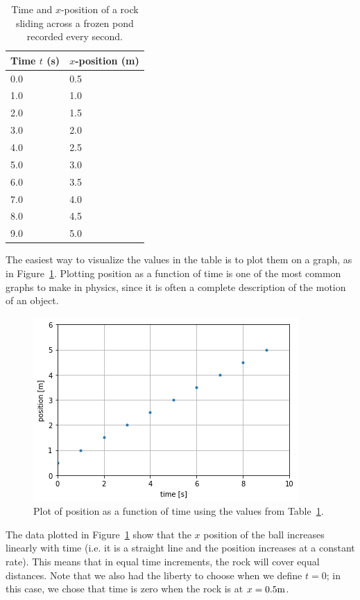 \begin{table}
\centering
\caption[]{Time and $x$-position of a rock sliding across a frozen pond recorded every second.}
\label{tab:MomentumAndCM:1dmotion}
\begin{tabular}{p{}p{}}
\toprule
Time $t$ (s) & $x$-position (m) \\
\hline
0.0 & 0.5 \\
1.0 & 1.0 \\
2.0 & 1.5 \\
3.0 & 2.0 \\
4.0 & 2.5 \\
5.0 & 3.0 \\
6.0 & 3.5 \\
7.0 & 4.0 \\
8.0 & 4.5 \\
9.0 & 5.0 \\
\bottomrule
\end{tabular}
\end{table}

The easiest way to visualize the values in the table is to plot them on a graph, as in Figure~\ref{fig:MomentumAndCM:1dxvst}. Plotting position as a function of time is one of the most common graphs to make in physics, since it is often a complete description of the motion of an object.

\begin{figure}[!htbp]
\centering
\includegraphics[width=0.7\linewidth]{files/1dxvst-d6543db2884dccdda7dabba7850de246.png}
\caption[]{Plot of position as a function of time using the values from Table~\ref{tab:MomentumAndCM:1dmotion}.}
\label{fig:MomentumAndCM:1dxvst}
\end{figure}

The data plotted in Figure~\ref{fig:MomentumAndCM:1dxvst} show that the $x$ position of the ball increases linearly with time (i.e. it is a straight line and the position increases at a constant rate). This means that in equal time increments, the rock will cover equal distances. Note that we also had the liberty to choose when we define $t=0$; in this case, we chose that time is zero when the rock is at $x=0.5 {\rm m}$.

